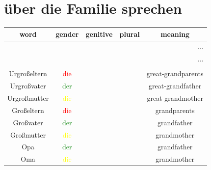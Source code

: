 \section{über die Familie sprechen}
\begin{center}
    \begin{longtable} {|c|c|c|c|c|}
        \hline
        \rowcolor{gray}
        word             & gender                  & genitive & plural                                   & meaning                   \\
        \hline
        \endfirsthead
        \multicolumn{5}{r}{...}                                                                                                      \\
        \hline
        \endhead
        \hline
        \multicolumn{5}{r}{...}                                                                                                      \\
        \endfoot
        \hline
        \endlastfoot
        \multicolumn{5}{|c|}{die Familie}                                                                                            \\
        \hline
        Urgroßeltern     & \textcolor{red}{die}    &          &                                          & great-grandparents        \\
        Urgroßvater      & \textcolor{green}{der}  &          &                                          & great-grandfather         \\
        Urgroßmutter     & \textcolor{yellow}{die} &          &                                          & great-grandmother         \\
        \hline
        Großeltern       & \textcolor{red}{die}    &          &                                          & grandparents              \\
        Großvater        & \textcolor{green}{der}  &          &                                          & grandfather               \\
        Großmutter       & \textcolor{yellow}{die} &          &                                          & grandmother               \\
        Opa              & \textcolor{green}{der}  &          &                                          & grandfather               \\
        Oma              & \textcolor{yellow}{die} &          &                                          & grandmother               \\

\end{longtable}
\end{center}
